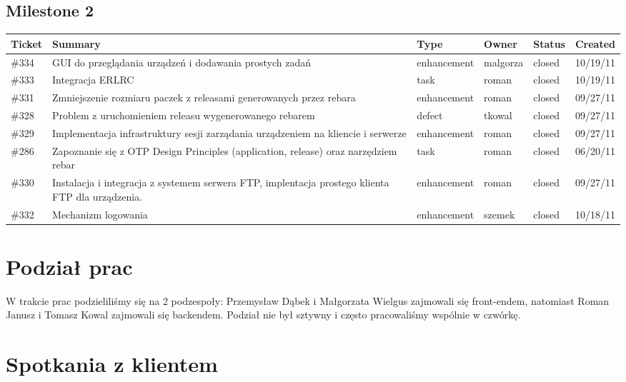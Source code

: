 \documentclass[polish,12pt]{aghthesis} \usepackage[utf8]{inputenc}
\begin{document}
\subsection{Milestone 2}
\begin{tabular}{| p{1.3cm} | p{5cm} | p{2.5cm} | p{1.5cm} | p{1.5cm} | p{1.5cm} |}
\hline
Ticket & Summary & Type & Owner & Status & Created \\ \hline
\#334 & GUI do przeglądania urządzeń i dodawania prostych zadań & enhancement & malgorza & closed & 10/19/11 \\ \hline
\#333 & Integracja ERLRC & task & roman & closed & 10/19/11 \\ \hline
\#331 & Zmniejszenie rozmiaru paczek z releasami generowanych przez rebara & enhancement & roman & closed & 09/27/11 \\ \hline
\#328 & Problem z uruchomieniem releasu wygenerowanego rebarem & defect & tkowal & closed & 09/27/11 \\ \hline
\#329 & Implementacja infrastruktury sesji zarządania urządzeniem na kliencie i serwerze & enhancement & roman & closed & 09/27/11 \\ \hline
\#286 & Zapoznanie się z OTP Design Principles (application, release) oraz narzędziem rebar & task & roman & closed & 06/20/11 \\ \hline
\#330 & Instalacja i integracja z systemem serwera FTP, implentacja prostego klienta FTP dla urządzenia. & enhancement & roman & closed & 09/27/11 \\ \hline
\#332 & Mechanizm logowania & enhancement & szemek & closed & 10/18/11 \\ \hline
\end{tabular}

\section{Podział prac}
W trakcie prac podzieliliśmy się na 2 podzespoły: Przemysław Dąbek i Małgorzata Wielgus zajmowali się front-endem, natomiast Roman Janusz i Tomasz Kowal zajmowali się backendem. Podział nie był sztywny i często pracowaliśmy wspólnie w czwórkę.

\section{Spotkania z klientem}
\end{document}
